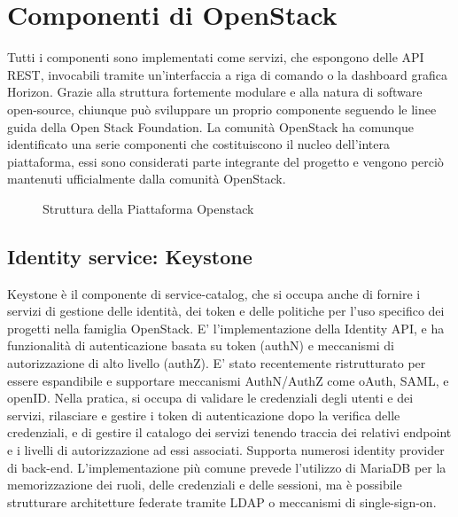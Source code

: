 \section{Componenti di OpenStack}
Tutti i componenti sono implementati come servizi, che espongono delle API REST, invocabili tramite un'interfaccia a riga di comando o la dashboard grafica Horizon.
Grazie alla struttura fortemente modulare e alla natura di software open-source, chiunque può sviluppare un proprio componente seguendo le linee guida della Open Stack Foundation.\cite{GuidelinesOpenstackHacking}
La comunità  OpenStack ha comunque identificato una serie componenti che costituiscono il nucleo dell'intera piattaforma, essi sono considerati parte integrante del progetto e vengono perciò mantenuti ufficialmente dalla comunità OpenStack.
\begin{figure}[H]
\centering
{}
\caption{Struttura della Piattaforma Openstack\cite{openstacksoftware}}\label{openstacksw}
\end{figure}
\subsection{Identity service: Keystone}
Keystone è il componente di service-catalog, che si occupa anche di fornire i servizi di gestione delle identità, dei token e delle politiche per l'uso specifico dei progetti nella famiglia OpenStack.
E' l'implementazione della Identity API, e ha funzionalità di autenticazione basata su token (authN) e meccanismi di autorizzazione di alto livello (authZ).
E' stato recentemente ristrutturato per essere espandibile e supportare meccanismi AuthN/AuthZ come oAuth, SAML, e openID.
Nella pratica, si occupa di validare le credenziali degli utenti e dei servizi, rilasciare e gestire i token di autenticazione dopo la verifica delle credenziali, e di gestire il catalogo dei servizi tenendo traccia dei relativi endpoint e i livelli di autorizzazione ad essi associati.
Supporta numerosi identity provider di back-end. L'implementazione più comune prevede l'utilizzo di MariaDB per la memorizzazione dei ruoli, delle credenziali e delle sessioni, ma è possibile strutturare architetture federate tramite LDAP o meccanismi di single-sign-on.

